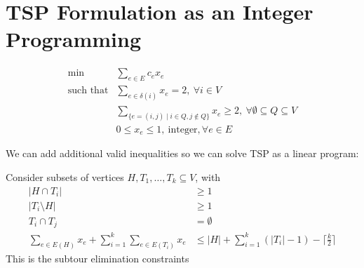 \section{TSP Formulation as an Integer Programming}

\begin{align*}
\min&\sum_{e\in E}c_ex_e\\
\text{such that}&\sum_{e\in\delta(i)}x_e=2,\ \forall i\in V\\
&\sum_{\{e=(i,j)\mid i\in Q,j\notin Q\}}x_e\ge2,\ \forall\emptyset\subseteq Q\subseteq V\\
&0\le x_e\le 1,\ \text{integer}, \forall e\in E
\end{align*}

We can add additional valid inequalities so we can solve TSP as a linear program:

Consider subsets of vertices $H,T_1,\dots,T_k\subseteq V$, with
\begin{align*}
|H\cap T_i|&\ge1\\
|T_i\setminus H|&\ge1\\
T_i\cap T_j&=\emptyset\\
\sum_{e\in E(H)}x_e+\sum_{i=1}^k\sum_{e\in E(T_i)}x_e&\le |H|+\sum_{i=1}^k(|T_i|-1)-\lceil\frac{k}{2}\rceil
\end{align*}
This is the subtour elimination constraints
































